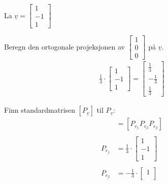 \documentclass[11pt, a4paper, norsk]{NTNUoving}
\begin{document}
    \begin{oppgave}
        La $\underline{v} = \begin{bmatrix}
            1 \\
            -1 \\
            1
        \end{bmatrix}$
        \begin{punkt}
            Beregn den ortogonale projeksjonen av $\begin{bmatrix}
                1 \\
                0 \\
                0
            \end{bmatrix}$ på $\underline{v}$.
            \begin{align*}
                \frac{1}{3} \cdot \begin{bmatrix}
                    1 \\
                    -1 \\
                    1
                \end{bmatrix} = \begin{bmatrix}
                    \frac{1}{3} \\
                    -\frac{1}{3} \\
                    \frac{1}{3}
                \end{bmatrix}
            \end{align*}
        \end{punkt}
        \begin{punkt}
            Finn standardmatrisen $[P_{\underline{v}}]$ til $P_{\underline{v}}$:
            \begin{align*}
                [P_{\underline{v}}] &= [P_{\underline{e_1}} P_{\underline{e_2}} P_{\underline{e_3}}]
                \\
                \\
                P_{\underline{e_1}} &= \frac{1}{3} \cdot \begin{bmatrix}
                    1 \\
                    -1 \\
                    1
                \end{bmatrix}
                \\
                \\
                    P_{\underline{e_2}} &= -\frac{1}{3} \cdot \begin{bmatrix}
                        1 \\

\end{bmatrix}
\end{align*}
\end{punkt}
\end{oppgave}
\end{document}
